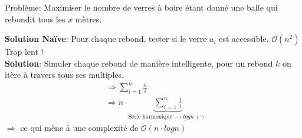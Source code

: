 \begin{frame}
    \frametitle{\problemtitle}
        \begin{block}
            {Problème:} Maximiser le nombre de verres à boire étant donné une balle qui rebondit tous les $x$ mètres.
        \end{block}
        \pause
        \textbf{Solution Naïve}: Pour chaque rebond, tester si le verre $a_i$ est accessible. $\mathcal O(n^2)$ Trop lent !\\
        \pause
        \textbf{Solution}: Simuler chaque rebond de manière intelligente, pour un rebond $k$ on itère à travers tous ses multiples. \\
        \pause
        \begin{align}
            &\Rightarrow \sum_{i=1}^{n} \frac{n}{i}\\
            &\Rightarrow n \cdot \underbrace{\sum_{i=1}^{n} \frac{1}{i}}_{\text{Série harmonique $\mapsto log n + \gamma$ }}
        \end{align}
        $\Rightarrow$ ce qui mène à une complexité de $\mathcal O(n \cdot log n)$

\end{frame}
